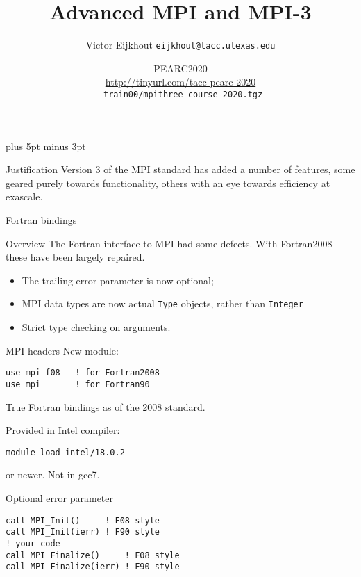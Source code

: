 \documentclass[11pt,headernav]{beamer}
\newcounter{tacc}
\def\Location{}%
\def\courseyear{2020}
\def\Location{TACC APP institute MPI training \courseyear}
\def\Location{TACC/XSEDE MPI training \courseyear}
\def\Location{PEARC2020\\
  \url{http://tinyurl.com/tacc-pearc-2020}\\
  \texttt{\char126 train00/mpithree\_course\_2020.tgz}
}
\newcounter{mpithree}
\begin{document}
\parskip=10pt plus 5pt minus 3pt

\title{Advanced MPI and MPI-3}
\author{Victor Eijkhout {\tt eijkhout@tacc.utexas.edu}}
\date{\Location}

\begin{frame}
  \titlepage
\end{frame}

\begin{xsede}
  
\end{xsede}

\begin{frame}{Justification}
  Version 3 of the MPI standard has added a number
  of features, some geared purely towards functionality,
  others with an eye towards efficiency at exascale.
\end{frame}

 {Fortran bindings}

\lstset{language=Fortran}
\begin{frame}{Overview}
  The Fortran interface to MPI had some defects.
  With Fortran2008 these have been largely repaired.
  \begin{itemize}
  \item The trailing error parameter is now optional;
  \item MPI data types are now actual \lstinline{Type} objects,
    rather than \lstinline{Integer}
  \item Strict type checking on arguments.
  \end{itemize}
\end{frame}

\begin{frame}[containsverbatim]{MPI headers}
\label{sl:mpi-header}
New module:
\begin{verbatim}
use mpi_f08   ! for Fortran2008
use mpi       ! for Fortran90
\end{verbatim}
True Fortran bindings as of the 2008 standard.
\begin{tacc}
Provided in Intel compiler:
\begin{verbatim}
module load intel/18.0.2
\end{verbatim}
or newer. Not in gcc7.
\end{tacc}
\end{frame}

\begin{frame}[containsverbatim]{Optional error parameter}
\lstset{language=Fortran}
\begin{lstlisting}
call MPI_Init()     ! F08 style
call MPI_Init(ierr) ! F90 style
! your code
call MPI_Finalize()     ! F08 style
call MPI_Finalize(ierr) ! F90 style
\end{lstlisting}
\end{frame}
\end{document}
